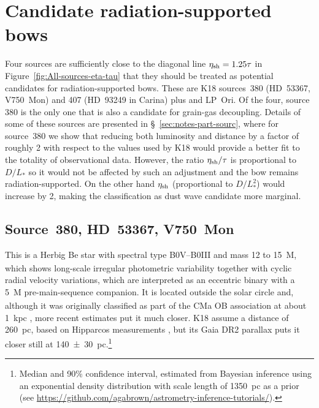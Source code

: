 \section{Candidate radiation-supported bows}
\label{sec:cand-radi-supp}

Four sources are sufficiently close to the diagonal line
\(\eta_{\text{sh}} = 1.25 \tau\) in Figure~\ref{fig:All-sources-eta-tau}
that they should be treated as potential candidates for
radiation-supported bows. These are K18 sources~380 (HD~53367,
V750~Mon) and 407 (HD~93249 in Carina) plus \thD{} and LP~Ori.  Of the
four, source 380 is the only one that is also a candidate for
grain-gas decoupling.  Details of some of these sources are presented
in \S~\ref{sec:notes-part-sourc}, where for source~380 we show that
reducing both luminosity and distance by a factor of roughly 2 with
respect to the values used by K18 would provide a better fit to the
totality of observational data.  However, the ratio
\(\eta_{\text{sh}} /\tau\) is proportional to \(D / L_*\) so it would not be
affected by such an adjustment and the bow remains
radiation-supported.  On the other hand \(\eta_{\text{sh}}\) (proportional
to \(D / L_*^2\)) would increase by 2, making the classification as
dust wave candidate more marginal.


\subsection{Source~380, HD~53367, V750~Mon}
\label{sec:hd-53367-v750}
  
This is a Herbig Be star with spectral type B0V--B0III and mass 12 to
\SI{15}{M_\odot}, which shows long-scale irregular photometric
variability \citep{Tjin-A-Djie:2001a, Pogodin:2006a} together with
cyclic radial velocity variations, which are interpreted as an
eccentric binary with a \SI{5}{M_\odot} pre-main-sequence companion.
It is located outside the solar circle and, although it was originally
classified as part of the CMa OB association at about \SI{1}{kpc}
\citep{Tjin-A-Djie:2001a}, more recent estimates put it much closer.
K18 assume a distance of \SI{260}{pc}, based on Hipparcos measurements
\citep{van-Leeuwen:2007a}, but its Gaia DR2 parallax
\citep{Gaia-Collaboration:2016a, Gaia-Collaboration:2018a, Luri:2018a}
puts it closer still at \SI{140 \pm 30}{pc}.\footnote{%
  Median and 90\% confidence interval, estimated from Bayesian
  inference using an exponential density distribution with scale
  length of \SI{1350}{pc} as a prior (see
  \url{https://github.com/agabrown/astrometry-inference-tutorials/}). }


